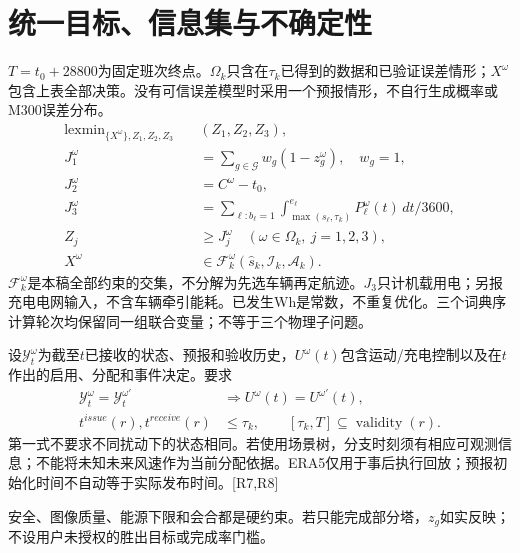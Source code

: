\section{统一目标、信息集与不确定性}
\noindent $T=t_0+28800$为固定班次终点。$\Omega_k$只含在$\tau_k$已得到的数据和已验证误差情形；$X^\omega$包含上表全部决策。没有可信误差模型时采用一个预报情形，不自行生成概率或M300误差分布。
\begin{align}
 \operatorname{lexmin}_{\{X^\omega\},Z_1,Z_2,Z_3}\quad &(Z_1,Z_2,Z_3),\label{eng:eq:objective}\\
 J_1^\omega&=\sum_{g\in\mathcal G}w_g(1-z_g^\omega),\quad w_g=1,\\
 J_2^\omega&=C^\omega-t_0,\\
 J_3^\omega&=\sum_{\ell:b_\ell=1}\int_{\max(s_\ell,\tau_k)}^{e_\ell}
                       P_\ell^\omega(t)\,dt/3600,\\
 Z_j&\ge J_j^\omega\quad(\omega\in\Omega_k,\ j=1,2,3),\\
 X^\omega&\in\mathcal F_k^\omega(\widehat s_k,\mathcal I_k,\mathcal A_k).
 \label{eng:eq:rollingjoint}
\end{align}
\noindent $\mathcal F_k^\omega$是本稿全部约束的交集，不分解为先选车辆再定航迹。$J_3$只计机载用电；另报充电电网输入，不含车辆牵引能耗。已发生Wh是常数，不重复优化。三个词典序计算轮次均保留同一组联合变量；不等于三个物理子问题。

\noindent 设$\mathcal Y_t^\omega$为截至$t$已接收的状态、预报和验收历史，$U^\omega(t)$包含运动/充电控制以及在$t$作出的启用、分配和事件决定。要求
\begin{align}
 \mathcal Y_t^\omega=\mathcal Y_t^{\omega'}&\Rightarrow
 U^\omega(t)=U^{\omega'}(t),\label{eng:eq:nonanticipativity}\\
 t^{issue}(r),t^{receive}(r)&\le\tau_k,\qquad
 [\tau_k,T]\subseteq\operatorname{validity}(r).
 \label{eng:eq:forecastcausality}
\end{align}
\noindent 第一式不要求不同扰动下的状态相同。若使用场景树，分支时刻须有相应可观测信息；不能将未知未来风速作为当前分配依据。ERA5仅用于事后执行回放；预报初始化时间不自动等于实际发布时间。[R7,R8]

\noindent 安全、图像质量、能源下限和会合都是硬约束。若只能完成部分塔，$z_g$如实反映；不设用户未授权的胜出目标或完成率门槛。
\clearpage

